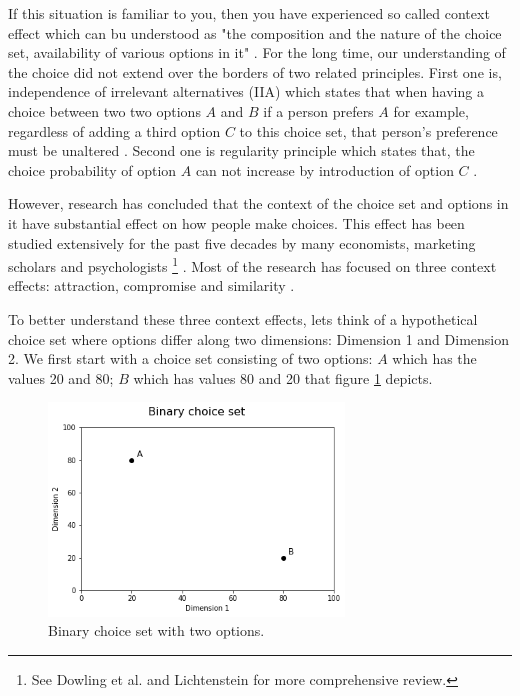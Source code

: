 \documentclass[a4paper,12pt]{article}
\newcommand{\citeyearonly}[1]{\citeyearpar{#1}}
\begin{document}
If this situation is familiar to you, then you have experienced so called context effect which can bu understood as "the composition  and the nature of the choice set, availability of various options in it" \citep{tversky1972elimination, huberPuto83}. For the long time, our understanding of the choice did not extend over the borders of two related principles. First one is, independence of irrelevant alternatives (IIA) which states that when having a choice between two two options $A$ and $B$ if a person prefers $A$ for example, regardless of adding a third option $C$ to this choice set, that person's preference must be unaltered \citep{luce59}. Second one is regularity principle which states that, the choice probability of option $A$ can not increase by introduction of option $C$ \citep{luce59}.

However, research has concluded that the context of the choice set and options in it have substantial effect on how people make choices. This effect has been studied extensively for the past five decades by many economists, marketing scholars and psychologists \footnote{See Dowling et al. \citeyearonly{dowlingEtAl20} and Lichtenstein \citeyearonly{lichtenstein2006construction} for more comprehensive review.} \citep{tverskySimonson93, kahnemanTversky79, simonson89, lichtenstein2006construction, dowlingEtAl20}. Most of the research has focused on three context effects: attraction, compromise and similarity \citep{howes2016contextual}.

To better understand these three context effects, lets think of a hypothetical choice set where options differ along two dimensions: Dimension 1 and Dimension 2. We first start with a choice set consisting of two options: $A$ which has the values 20 and 80; $B$ which has values 80 and 20 that figure \ref{fig:binaryChoiseSet} depicts. 

\begin{figure}[h]
    \centering
    \includegraphics[width=0.7\textwidth]{staticFiles/noEffect.png}
    \caption{Binary choice set with two options.} %
    \label{fig:binaryChoiseSet} %

\end{figure}
\end{document}
